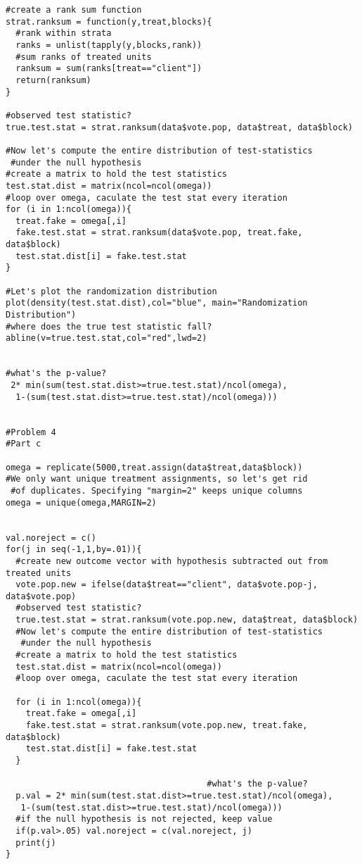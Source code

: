 \documentclass{article}
\begin{document}
\begin{verbatim}
#create a rank sum function
strat.ranksum = function(y,treat,blocks){
  #rank within strata
  ranks = unlist(tapply(y,blocks,rank))
  #sum ranks of treated units
  ranksum = sum(ranks[treat=="client"])
  return(ranksum)
}

#observed test statistic?
true.test.stat = strat.ranksum(data$vote.pop, data$treat, data$block)

#Now let's compute the entire distribution of test-statistics 
 #under the null hypothesis
#create a matrix to hold the test statistics
test.stat.dist = matrix(ncol=ncol(omega))
#loop over omega, caculate the test stat every iteration
for (i in 1:ncol(omega)){
  treat.fake = omega[,i]
  fake.test.stat = strat.ranksum(data$vote.pop, treat.fake, data$block)
  test.stat.dist[i] = fake.test.stat
}

#Let's plot the randomization distribution
plot(density(test.stat.dist),col="blue", main="Randomization Distribution")
#where does the true test statistic fall?
abline(v=true.test.stat,col="red",lwd=2)


#what's the p-value?
 2* min(sum(test.stat.dist>=true.test.stat)/ncol(omega),
  1-(sum(test.stat.dist>=true.test.stat)/ncol(omega)))

       
#Problem 4
#Part c

omega = replicate(5000,treat.assign(data$treat,data$block))
#We only want unique treatment assignments, so let's get rid 
 #of duplicates. Specifying "margin=2" keeps unique columns
omega = unique(omega,MARGIN=2)


val.noreject = c()
for(j in seq(-1,1,by=.01)){
  #create new outcome vector with hypothesis subtracted out from treated units
  vote.pop.new = ifelse(data$treat=="client", data$vote.pop-j, data$vote.pop) 
  #observed test statistic?
  true.test.stat = strat.ranksum(vote.pop.new, data$treat, data$block)
  #Now let's compute the entire distribution of test-statistics
   #under the null hypothesis
  #create a matrix to hold the test statistics
  test.stat.dist = matrix(ncol=ncol(omega))
  #loop over omega, caculate the test stat every iteration
  
  for (i in 1:ncol(omega)){
    treat.fake = omega[,i]
    fake.test.stat = strat.ranksum(vote.pop.new, treat.fake, data$block)
    test.stat.dist[i] = fake.test.stat
  }

                                        #what's the p-value?
  p.val = 2* min(sum(test.stat.dist>=true.test.stat)/ncol(omega),
   1-(sum(test.stat.dist>=true.test.stat)/ncol(omega)))
  #if the null hypothesis is not rejected, keep value
  if(p.val>.05) val.noreject = c(val.noreject, j)
  print(j)
}


\end{verbatim}
\end{document}
